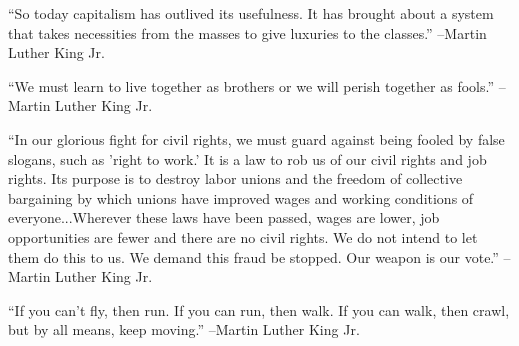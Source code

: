 \documentclass{article}%
\begin{document}
\linebreak%
\vspace{1mm}%
\begin{minipage}{\textwidth}%
\flushleft%
“So today capitalism has outlived its usefulness. It has brought about a system that takes necessities from the masses to give luxuries to the classes.”%
\linebreak%
\vspace{1mm}%
–Martin Luther King Jr.%
\linebreak%
\vspace{1mm}%
\end{minipage}%
\linebreak%
\vspace{1mm}%
\begin{minipage}{\textwidth}%
\flushleft%
“We must learn to live together as brothers or we will perish together as fools.”%
\linebreak%
\vspace{1mm}%
–Martin Luther King Jr.%
\linebreak%
\vspace{1mm}%
\end{minipage}%
\linebreak%
\vspace{1mm}%
\begin{minipage}{\textwidth}%
\flushleft%
“In our glorious fight for civil rights, we must guard against being fooled by false slogans, such as 'right to work.' It is a law to rob us of our civil rights and job rights. Its purpose is to destroy labor unions and the freedom of collective bargaining by which unions have improved wages and working conditions of everyone...Wherever these laws have been passed, wages are lower, job opportunities are fewer and there are no civil rights. We do not intend to let them do this to us. We demand this fraud be stopped. Our weapon is our vote.”%
\linebreak%
\vspace{1mm}%
–Martin Luther King Jr.%
\linebreak%
\vspace{1mm}%
\end{minipage}%
\linebreak%
\vspace{1mm}%
\begin{minipage}{\textwidth}%
\flushleft%
“If you can't fly, then run. If you can run, then walk. If you can walk, then crawl, but by all means, keep moving.”%
\linebreak%
\vspace{1mm}%
–Martin Luther King Jr.%
\linebreak%
\vspace{1mm}%
\end{minipage}%
\end{document}
